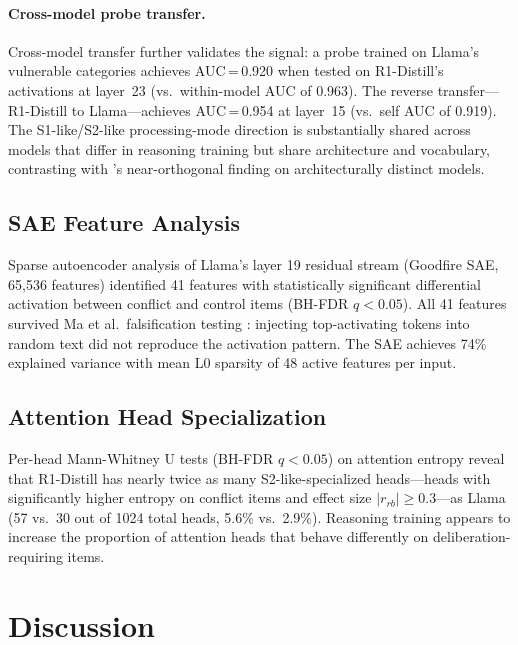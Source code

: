 \documentclass[accepted]{article}
\newcommand{\sone}{S1-like}
\newcommand{\stwo}{S2-like}
\begin{document}
\paragraph{Cross-model probe transfer.}
Cross-model transfer further validates the signal: a probe trained on
Llama's vulnerable categories achieves AUC\,=\,0.920 when tested on
R1-Distill's activations at layer~23 (vs.\ within-model AUC of 0.963).
The reverse transfer---R1-Distill to Llama---achieves AUC\,=\,0.954 at
layer~15 (vs.\ self AUC of 0.919).  The \sone{}/\stwo{} processing-mode
direction is substantially shared across models that differ in reasoning
training but share architecture and vocabulary, contrasting with
\citet{huang2026cogbias}'s near-orthogonal finding on architecturally
distinct models.

\subsection{SAE Feature Analysis}
\label{sec:results_sae}

Sparse autoencoder analysis of Llama's layer 19 residual stream (Goodfire SAE, 65,536 features) identified 41 features with statistically significant differential activation between conflict and control items (BH-FDR $q < 0.05$). All 41 features survived Ma et al.\ falsification testing \citep{ma2026falsification}: injecting top-activating tokens into random text did not reproduce the activation pattern. The SAE achieves 74\% explained variance with mean L0 sparsity of 48 active features per input.

\subsection{Attention Head Specialization}
\label{sec:results_attention}

Per-head Mann-Whitney U tests (BH-FDR $q < 0.05$) on attention entropy reveal that R1-Distill has nearly twice as many \stwo{}-specialized heads---heads with significantly higher entropy on conflict items and effect size $|r_{rb}| \geq 0.3$---as Llama (57 vs.\ 30 out of 1024 total heads, 5.6\% vs.\ 2.9\%). Reasoning training appears to increase the proportion of attention heads that behave differently on deliberation-requiring items.


\section{Discussion}
\label{sec:discussion}
\end{document}
